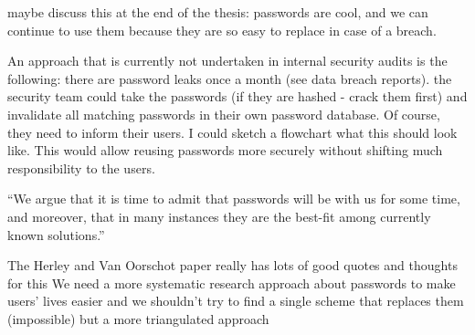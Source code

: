 maybe discuss this at the end of the thesis: passwords are cool, and we can continue to use them because they are so easy to replace in case of a breach. 

An approach that is currently not undertaken in internal security audits is the following: there are password leaks once a month (see data breach reports). the security team could take the passwords (if they are hashed - crack them first) and invalidate all matching passwords in their own password database. Of course, they need to inform their users. I could sketch a flowchart what this should look like. This would allow reusing passwords more securely without shifting much responsibility to the users. 

``We argue that it is time to admit that passwords will be with us for some time, and moreover, that in many instances they are the best-fit among currently known solutions.'' \cite{Herley2012PersistenceOfPasswords} 

The Herley and Van Oorschot paper really has lots of good quotes and thoughts for this
We need a more systematic research approach about passwords to make users' lives easier and we shouldn't try to find a single scheme that replaces them (impossible) but a more triangulated approach \cite{Herley2012PersistenceOfPasswords}


\cite{Kirlappos2012SecurityEducation,Loutfi2015PasswordsOtherSideOfTheFence,DeAngeli2005PictureThousandWords,Florencio2013WhereDoAllTheAttacksGo,Herley2008ProfitlessEndeavor,Sasse2015,Dittrich2009,Herley2009SoLongThanksExternalities,Vantaggiato2015WeStillNeedPasswords,Florencio2010WhereDoPoliciesComeFrom,Schrittwieser2013,Bonneau2015ImperfectAuthentication,Cyber2014,Florencio2007DoStrongWebPasswords,Sasse2005UsableSecurityPosition,Aebischer2017PicoInTheWild,Forget2007HelpingUsers,Herley2009IfWereSoSmart,Acar2016NotYourDeveloper,Sasse2016,Renaud2009VisualSnakeOil}

 